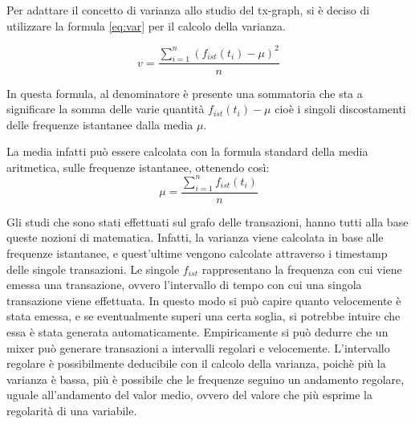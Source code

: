 Per adattare il concetto di varianza allo studio del tx-graph, si è deciso di utilizzare la formula \ref{eq:var} per il calcolo della varianza.

\begin{equation}
v =  \frac{ \sum_{i=1}^n (f_{ist}(t_i) - \mu )^2 }{n}
\label{eq:var}
\end{equation}

In questa formula, al denominatore è presente una sommatoria che sta a significare la somma delle varie quantità $f_{ist}(t_i) - \mu$ cioè i singoli discostamenti delle frequenze istantanee dalla media $\mu$.

La media infatti può essere calcolata con la formula standard della media aritmetica, sulle frequenze istantanee, ottenendo così:
\begin{equation}
	\mu = \frac{\sum_{i=1}^{n} f_{ist}(t_i)}{n}
\end{equation}

Gli studi che sono stati effettuati sul grafo delle transazioni, hanno tutti alla base queste nozioni di matematica. Infatti, la varianza viene calcolata in base alle frequenze istantanee, e quest'ultime vengono calcolate attraverso i timestamp delle singole transazioni. Le singole $f_{ist}$ rappresentano la frequenza con cui viene emessa una transazione, ovvero l'intervallo di tempo con cui una singola transazione viene effettuata. In questo modo si può capire quanto velocemente è stata emessa, e se eventualmente superi una certa soglia, si potrebbe intuire che essa è stata generata automaticamente. Empiricamente si può dedurre che un mixer può generare transazioni a intervalli regolari e velocemente. L'intervallo regolare è possibilmente deducibile con il calcolo della varianza, poichè più la varianza è bassa, più è possibile che le frequenze seguino un andamento regolare, uguale all'andamento del valor medio, ovvero del valore che più esprime la regolarità di una variabile. 
